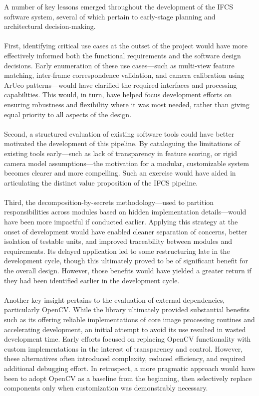 \documentclass{article}
\begin{document}
A number of key lessons emerged throughout the development of the IFCS software system, several of which pertain to early-stage planning and architectural decision-making.\\ \\
First, identifying critical use cases at the outset of the project would have more effectively informed both the functional requirements and the software design decisions. Early enumeration of these use cases---such as multi-view feature matching, inter-frame correspondence validation, and camera calibration using ArUco patterns---would have clarified the required interfaces and processing capabilities. This would, in turn, have helped focus development efforts on ensuring robustness and flexibility where it was most needed, rather than giving equal priority to all aspects of the design. 
\\ \\
Second, a structured evaluation of existing software tools could have better motivated the development of this pipeline. By cataloguing the limitations of existing tools early---such as lack of transparency in feature scoring, or rigid camera model assumptions---the motivation for a modular, customizable system becomes clearer and more compelling. Such an exercise would have aided in articulating the distinct value proposition of the IFCS pipeline.
\\ 
\\
Third, the decomposition-by-secrets methodology---used to partition responsibilities across modules based on hidden implementation details---would have been more impactful if conducted earlier. Applying this strategy at the onset of development would have enabled cleaner separation of concerns, better isolation of testable units, and improved traceability between modules and requirements. Its delayed application led to some restructuring late in the development cycle, though this ultimately proved to be of significant benefit for the overall design. However, those benefits would have yielded a greater return if they had been identified earlier in the development cycle.
\\ 
\\
Another key insight pertains to the evaluation of external dependencies, particularly OpenCV. While the library ultimately provided substantial benefits such as its offering reliable implementations of core image processing routines and accelerating development, an initial attempt to avoid its use resulted in wasted development time. Early efforts focused on replacing OpenCV functionality with custom implementations in the interest of transparency and control. However, these alternatives often introduced complexity, reduced efficiency, and required additional debugging effort. In retrospect, a more pragmatic approach would have been to adopt OpenCV as a baseline from the beginning, then selectively replace components only when customization was demonstrably necessary. 
\end{document}
